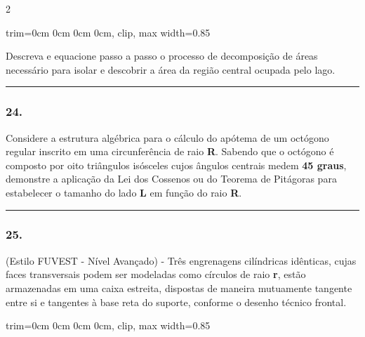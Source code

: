\documentclass[twoside, 10pt, a4paper]{article}
\newlength{\espacoPreQuestao}\setlength{\espacoPreQuestao}{0.1cm}
\newlength{\espacoQuestao}\setlength{\espacoQuestao}{0.2cm}
\newcommand{\larguraTikz}{0.85\linewidth}
\begin{document}
\begin{multicols*}{2}
\begin{center}
\begin{adjustbox}{trim=0cm 0cm 0cm 0cm, clip, max width=\larguraTikz}
\end{adjustbox}
\end{center}
Descreva e equacione passo a passo o processo de decomposição de áreas necessário para isolar e descobrir a área da região central ocupada pelo lago.
\par\vspace{\espacoQuestao}

\noindent\textcolor{CorLinha}{\rule{\linewidth}{0.5pt}} 
\par\vspace{\espacoPreQuestao}
\subsubsection*{24.} Considere a estrutura algébrica para o cálculo do apótema de um octógono regular inscrito em uma circunferência de raio \textbf{R}. Sabendo que o octógono é composto por oito triângulos isósceles cujos ângulos centrais medem \textbf{45 graus}, demonstre a aplicação da Lei dos Cossenos ou do Teorema de Pitágoras para estabelecer o tamanho do lado \textbf{L} em função do raio \textbf{R}.
\par\vspace{\espacoQuestao}

\noindent\textcolor{CorLinha}{\rule{\linewidth}{0.5pt}} 
\par\vspace{\espacoPreQuestao}
\subsubsection*{25.} (Estilo FUVEST - Nível Avançado) - Três engrenagens cilíndricas idênticas, cujas faces transversais podem ser modeladas como círculos de raio \textbf{r}, estão armazenadas em uma caixa estreita, dispostas de maneira mutuamente tangente entre si e tangentes à base reta do suporte, conforme o desenho técnico frontal.
\begin{center}
\begin{adjustbox}{trim=0cm 0cm 0cm 0cm, clip, max width=\larguraTikz}
\end{adjustbox}
\end{center}
\end{multicols*}
\end{document}
